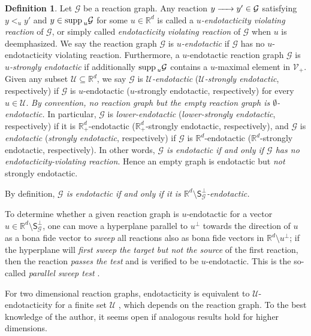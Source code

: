 \documentclass[10pt]{amsart}
\numberwithin{equation}{section}
\theoremstyle{plain}
\theoremstyle{definition}
\newtheorem{definition}[theorem]{Definition}
\theoremstyle{remark}
\newcommand{\cG}{\mathcal{G}}
\newcommand{\cU}{\mathcal{U}}
\newcommand{\cV}{\mathcal{V}}
\newcommand{\supp}{{\rm supp\,}}
\begin{document}
\begin{definition}\label{def:endotacticity}
Let $\cG$ be a  reaction graph. Any reaction $y\ce{->[]} y'\in\cG$ satisfying $y<_uy'$ and
 $y\in\supp_u\cG$  for some $u\in\mathbb{R}^d$ is called a \emph{$u$-endotacticity violating reaction} of $\cG$, or simply called \emph{endotacticity violating reaction} of $\cG$ when $u$ is deemphasized.
We say the reaction graph $\mathcal{G}$ is \emph{$u$-endotactic} if $\cG$ has no $u$-endotacticity violating reaction.  Furthermore, a $u$-endotactic reaction graph $\cG$ is \emph{$u$-strongly endotactic} if additionally
$\supp_u\cG$ contains a $u$-maximal element in $\cV_+$. Given any subset $\cU\subseteq\mathbb{R}^d$,  we say $\cG$ is \emph{$\mathcal{U}$-endotactic} (\emph{$\mathcal{U}$-strongly endotactic}, respectively) if $\cG$ is $u$-endotactic ($u$-strongly endotactic, respectively) for every  $u\in\cU$. \emph{By convention, no reaction graph but the empty reaction graph is $\emptyset$-endotactic.}
 In particular, $\cG$ is \emph{lower-endotactic} (\emph{lower-strongly endotactic}, respectively) if it is $\mathbb{R}^d_+$-endotactic ($\mathbb{R}^d_+$-strongly endotactic, respectively), and $\cG$ is   \emph{endotactic} (\emph{strongly endotactic}, respectively) if $\cG$ is $\mathbb{R}^d$-endotactic ($\mathbb{R}^d$-strongly endotactic, respectively). In other words, \emph{$\cG$ is endotactic if and only if $\cG$ has no endotacticity-violating reaction}. Hence an empty graph is endotactic but \emph{not} strongly endotactic.
\end{definition}

By definition, \emph{$\cG$ is endotactic if and only if it is $\mathbb{R}^d\setminus\mathsf{S}^{\perp}_{\cG}$-endotactic.}

To determine whether a given reaction graph is $u$-endotactic for a vector $u\in\mathbb{R}^d\setminus\mathsf{S}^{\perp}_{\cG}$, one can move a hyperplane parallel to $u^{\perp}$ towards the direction of $u$ as a bona fide vector to \emph{sweep} all reactions  also as bona fide vectors in $\mathbb{R}^d\setminus u^{\perp}$; if the hyperplane will \emph{first sweep the target but not the source} of the first reaction, then the reaction \emph{passes the test}  and is verified to be $u$-endotactic. This is the so-called  \emph{parallel sweep test} \cite{CNP13}.


For two dimensional reaction graphs, endotacticity is equivalent to $\mathcal{U}$-endotacticity for a finite set $\mathcal{U}$  \cite[Proposition~4.1]{CNP13}, which depends on the reaction graph. To the best knowledge of the author, it seems open if analogous results hold for higher dimensions.
\end{document}
